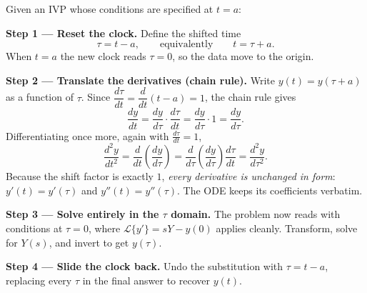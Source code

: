 \documentclass[11pt]{article}
\begin{document}
\begin{methodbox}
Given an IVP whose conditions are specified at $t = a$:

\smallskip
\textbf{Step 1 --- Reset the clock.} Define the shifted time
\[ \tau = t - a, \qquad\text{equivalently}\qquad t = \tau + a. \]
When $t = a$ the new clock reads $\tau = 0$, so the data move to the origin.

\smallskip
\textbf{Step 2 --- Translate the derivatives (chain rule).} Write $y(t) = y(\tau + a)$ as a function of $\tau$. Since $\dfrac{d\tau}{dt} = \dfrac{d}{dt}(t - a) = 1$, the chain rule gives
\[ \frac{dy}{dt} = \frac{dy}{d\tau}\cdot\frac{d\tau}{dt} = \frac{dy}{d\tau}\cdot 1 = \frac{dy}{d\tau}. \]
Differentiating once more, again with $\frac{d\tau}{dt} = 1$,
\[ \frac{d^2 y}{dt^2} = \frac{d}{dt}\!\left(\frac{dy}{d\tau}\right) = \frac{d}{d\tau}\!\left(\frac{dy}{d\tau}\right)\frac{d\tau}{dt} = \frac{d^2 y}{d\tau^2}. \]
Because the shift factor is exactly $1$, \emph{every derivative is unchanged in form}: $y'(t) = y'(\tau)$ and $y''(t) = y''(\tau)$. The ODE keeps its coefficients verbatim.

\smallskip
\textbf{Step 3 --- Solve entirely in the $\tau$ domain.} The problem now reads with conditions at $\tau = 0$, where $\mathcal{L}\{y'\} = sY - y(0)$ applies cleanly. Transform, solve for $Y(s)$, and invert to get $y(\tau)$.

\smallskip
\textbf{Step 4 --- Slide the clock back.} Undo the substitution with $\tau = t - a$, replacing every $\tau$ in the final answer to recover $y(t)$.
\end{methodbox}
\end{document}

